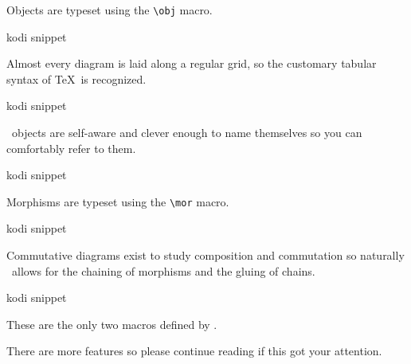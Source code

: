 Objects are typeset using the \lstinline!\obj! macro.
%
\begin{tcblisting}{kodi snippet}
\nilstrut{}
\end{tcblisting}
%
Almost every diagram is laid along a regular grid,
so the customary tabular syntax of \TeX\ is recognized.
%
\begin{tcblisting}{kodi snippet}
\nilstrut{}
\end{tcblisting}
%
\koDi\ objects are self-aware and clever enough to name themselves
so you can comfortably refer to them.
%
\begin{tcblisting}{kodi snippet}
\nilstrut{}
\end{tcblisting}
%
Morphisms are typeset using the \lstinline!\mor! macro.
%
\begin{tcblisting}{kodi snippet}
\nilstrut{}
\end{tcblisting}
%
Commutative diagrams exist to study composition and commutation
so naturally \koDi\ allows for the chaining of morphisms and
the gluing of chains.
%
\begin{tcblisting}{kodi snippet}
\nilstrut{}
\end{tcblisting}
%
These are the only two macros defined by \koDi.

There are more features so please continue reading if this got your attention.
